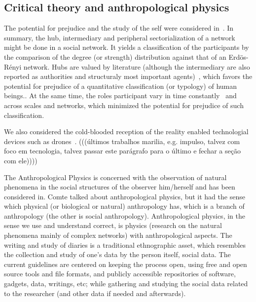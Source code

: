 \documentclass[letterpaper,10pt]{article}
\begin{document}
\subsection{Critical theory and anthropological physics}\label{exp}
The potential for prejudice and the study of the self
were considered in~\cite{imp,stab,tese}.
In summary, the hub, intermediary and peripheral sectorialization
of a network might be done in a social network.
It yields a classification of the participants
by the comparison of the degree (or strength) distribution
against that of an Erdös-Rényi network.
Hubs are valued by literature
(although the intermediary are also reported as authorities
and structuraly most important agents)~\cite{ega},
which favors the potential for prejudice
of a quantitative classification (or typology)
of human beings..
At the same time, the roles participant
vary in time constantly~\cite{stab,tese}
and across scales and networks,
which minimized the potential
for prejudice of such classification.

We also considered the cold-blooded reception of the reality
enabled technologial devices such as drones~\cite{drones}.
(((últimos trabalhos marilia, e.g. impulso,
talvez com foco em tecnologia, talvez passar
este parágrafo para o último e fechar a seção com ele))))


The Anthropological Physics is concerned
with the observation of natural
phenomena in the social structures
of the observer him/herself and has been
considered in.
Comte talked about anthropological physics,
but it had the sense which physical (or biological or natural)
anthropology has, which is a branch of anthropology
(the other is social anthropology).
Anthropological physics, in the sense we use and understand correct,
is physics (research on the natural phenomena mainly of complex networks)
with anthropological aspects.
The writing and study of diaries is a traditional ethnographic asset,
which resembles the collection and study of one's data by the person itself,
social data.
The current guidelines are centered on keeping the process open,
using free and open source tools and file formats,
and publicly accessible repositories of software, gadgets, data, writings, etc;
while gathering and studying the social data related to the researcher
(and other data if needed and afterwards).~\cite{an,an2,imp,tese}
\end{document}
